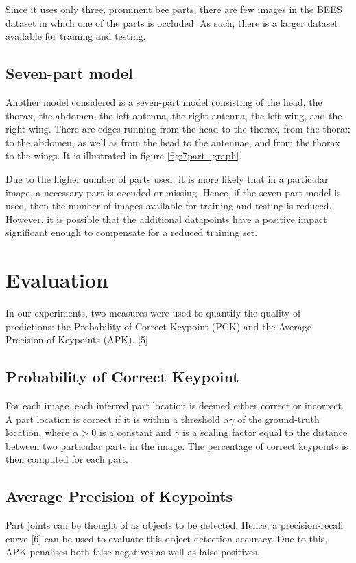 \documentclass[11pt, oneside]{report}
\begin{document}
        Since it uses only three, prominent bee parts, there are few images in the BEES dataset in which one of the parts is occluded. As such, there is a larger dataset available for training and testing.

    \subsection{Seven-part model}
        Another model considered is a seven-part model consisting of the head, the thorax, the abdomen, the left antenna, the right antenna, the left wing, and the right wing. There are edges running from the head to the thorax, from the thorax to the abdomen, as well as from the head to the antennae, and from the thorax to the wings. It is illustrated in figure \ref{fig:7part_graph}.

        Due to the higher number of parts used, it is more likely that in a particular image, a necessary part is occuded or missing. Hence, if the seven-part model is used, then the number of images available for training and testing is reduced. However, it is possible that the additional datapoints have a positive impact significant enough to compensate for a reduced training set.

\section{Evaluation}
    In our experiments, two measures were used to quantify the quality of predictions: the Probability of Correct Keypoint (PCK) and the Average Precision of Keypoints (APK). [5]

    \subsection{Probability of Correct Keypoint}
        For each image, each inferred part location is deemed either correct or incorrect. A part location is correct if it is within a threshold $\alpha\gamma$ of the ground-truth location, where $\alpha>0$ is a constant and $\gamma$ is a scaling factor equal to the distance between two particular parts in the image. The percentage of correct keypoints is then computed for each part.

    \subsection{Average Precision of Keypoints}
        Part joints can be thought of as objects to be detected. Hence, a precision-recall curve [6] can be used to evaluate this object detection accuracy. Due to this, APK penalises both false-negatives as well as false-positives.
\end{document}
